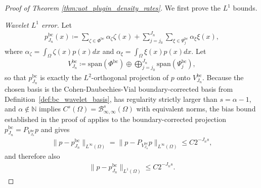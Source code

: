 \documentclass[11pt,reqno]{amsart}
\theoremstyle{definition}
\begin{document}
\begin{proof}[Proof of Theorem \ref{thm:uot_plugin_density_rates}]
We first prove the $L^1$ bounds.

\smallskip
\noindent\emph{Wavelet $L^1$ error.}
Let
\begin{align*}
    p_{J_n}^{\mathrm{bc}}(x)
    \coloneqq
    \sum_{\zeta\in\Phi^{\mathrm{bc}}}\alpha_\zeta\zeta(x)
    + \sum_{j=j_0}^{J_n}\sum_{\xi\in\Psi_j^{\mathrm{bc}}}\alpha_\xi\xi(x),
\end{align*}
where $\alpha_\zeta=\int_{\Omega}\zeta(x)p(x) dx$ and $\alpha_\xi=\int_{\Omega}\xi(x)p(x) dx$.
Let
\begin{align*}
    V_{J_n}^{\mathrm{bc}}
    \coloneqq
    \mathrm{span}(\Phi^{\mathrm{bc}})
    \oplus
    \bigoplus_{j=j_0}^{J_n}\mathrm{span}(\Psi_j^{\mathrm{bc}}),
\end{align*}
so that $p_{J_n}^{\mathrm{bc}}$ is exactly the $L^2$-orthogonal projection of $p$ onto $V_{J_n}^{\mathrm{bc}}$.
Because the chosen basis is the Cohen-Daubechies-Vial boundary-corrected basis from Definition~\ref{def:bc_wavelet_basis}, has regularity strictly larger than $s=\alpha-1$, and $\alpha\notin\mathbb N$ implies $C^s(\Omega)=\mathcal B^s_{\infty,\infty}(\Omega)$ with equivalent norms, the bias bound established in the proof of \cite[Lemma 30]{manole2024plugin} applies to the boundary-corrected projection $p_{J_n}^{\mathrm{bc}}=P_{V_{J_n}^{\mathrm{bc}}}p$ and gives
\begin{align*}
    \|p-p_{J_n}^{\mathrm{bc}}\|_{L^\infty(\Omega)}
    =
    \|p-P_{V_{J_n}^{\mathrm{bc}}}p\|_{L^\infty(\Omega)}
    \le
    C2^{-J_ns},
\end{align*}
and therefore also
\begin{align*}
    \|p-p_{J_n}^{\mathrm{bc}}\|_{L^1(\Omega)}
    \le
    C2^{-J_ns}.
\end{align*}


\end{proof}
\end{document}
